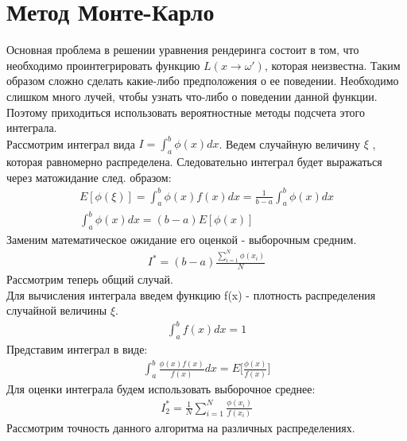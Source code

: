\documentclass[titlepage]{article}
\begin{document}
\section{Метод Монте-Карло}
Основная проблема в решении уравнения рендеринга состоит в том, что необходимо проинтегрировать функцию 
$L(x\rightarrow\omega')$, которая неизвестна. Таким образом сложно сделать какие-либо предположения о  ее поведении. Необходимо слишком много лучей, чтобы узнать что-либо о поведении данной функции. Поэтому приходиться использовать вероятностные методы подсчета этого интеграла.\\
Рассмотрим интеграл вида $I = \int_a^b\phi(x)dx$. Ведем случайную величину $\xi$ , которая равномерно распределена. Следовательно интеграл будет выражаться через матожидание след. образом:
\begin{gather}
	E[\phi(\xi)] = \int_a^b\phi(x)f(x)dx = \frac{1}{b - a} \int_a^b\phi(x)dx \\
	\int_a^b\phi(x)dx = (b - a)E[\phi(x)]
\end{gather}
Заменим математическое ожидание его оценкой - выборочным средним.
\begin{gather}
	I^{*} = (b - a)\frac{\sum_{i = 1}^N\phi(x_i)}{N}
\end{gather}
Рассмотрим теперь общий случай. \\
	Для вычисления интеграла введем функцию f(x) - плотность распределения случайной величины $\xi$.
\begin{gather}
	\int_a^bf(x)dx = 1
\end{gather}
	Представим интеграл в виде:
\begin{gather}
	\int_a^b\frac{\phi(x)f(x)}{f(x)}dx = E\bigg[\frac{\phi(x)}{f(x)}\bigg]
\end{gather}
Для оценки интеграла будем использовать выборочное среднее:
\begin{gather}
	I_2^{*} = \frac{1}{N}\sum_{i = 1}^N\frac{\phi(x_i)}{f(x_i)} 
\end{gather}
Рассмотрим точность данного алгоритма на различных распределениях.
\end{document}
